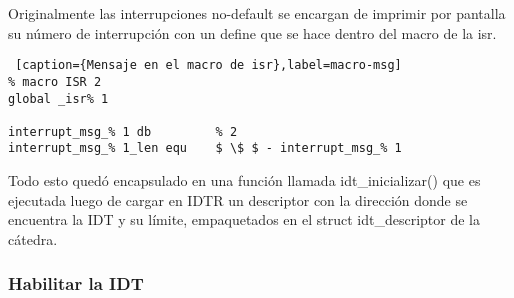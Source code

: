 Originalmente las interrupciones no-default se encargan de imprimir por pantalla su número de interrupción con un define que se hace dentro del macro de la isr.
\begin{lstlisting} [caption={Mensaje en el macro de isr},label=macro-msg]
% macro ISR 2
global _isr% 1

interrupt_msg_% 1 db         % 2
interrupt_msg_% 1_len equ    $ \$ $ - interrupt_msg_% 1

\end{lstlisting}

Todo esto quedó encapsulado en una función llamada idt_inicializar() que es ejecutada luego de cargar en IDTR un descriptor con la dirección donde se encuentra la IDT y su límite, empaquetados en el struct idt_descriptor de la cátedra.


\subsubsection{Habilitar la IDT}
